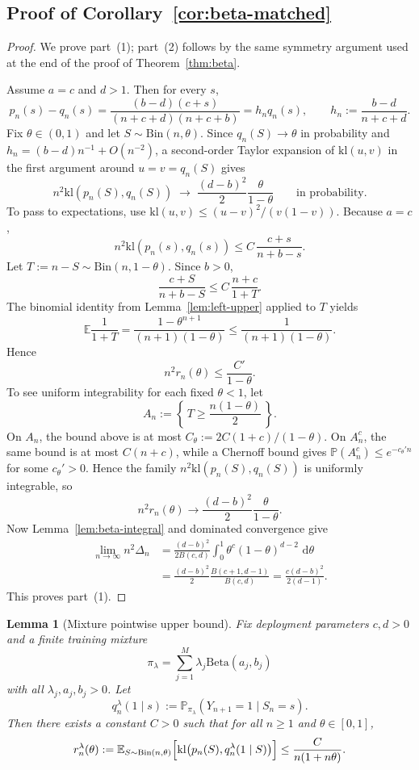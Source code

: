 \documentclass{article}
\newtheorem{lemma}[theorem]{Lemma}
\theoremstyle{definition}
\theoremstyle{remark}
\newcommand{\E}{\mathbb{E}}
\newcommand{\Pbb}{\mathbb{P}}
\newcommand{\BetaDist}{\mathrm{Beta}}
\newcommand{\Bin}{\mathrm{Bin}}
\newcommand{\klb}{\mathrm{kl}}
\newcommand{\dd}{\,\mathrm{d}}
\begin{document}
\subsection{Proof of Corollary~\ref{cor:beta-matched}}
\begin{proof}
We prove part~(1); part~(2) follows by the same symmetry argument used at the end of the proof of Theorem~\ref{thm:beta}.

Assume $a=c$ and $d>1$. Then for every $s$,
\[
p_n(s)-q_n(s)
=
\frac{(b-d)(c+s)}{(n+c+d)(n+c+b)}
=
h_n q_n(s),
\qquad
h_n:=\frac{b-d}{n+c+d}.
\]
Fix $\theta\in(0,1)$ and let $S\sim \Bin(n,\theta)$. Since $q_n(S)\to \theta$ in probability and $h_n=(b-d)n^{-1}+O(n^{-2})$, a second-order Taylor expansion of $\klb(u,v)$ in the first argument around $u=v=q_n(S)$ gives
\[
n^2 \klb(p_n(S),q_n(S))
\;\longrightarrow\;
\frac{(d-b)^2}{2}\frac{\theta}{1-\theta}
\qquad\text{in probability.}
\]
To pass to expectations, use $\klb(u,v)\le (u-v)^2/(v(1-v))$. Because $a=c$,
\[
n^2 \klb(p_n(s),q_n(s))
\le
C\,\frac{c+s}{n+b-s}.
\]
Let $T:=n-S\sim \Bin(n,1-\theta)$. Since $b>0$,
\[
\frac{c+S}{n+b-S}
\le
C\,\frac{n+c}{1+T}.
\]
The binomial identity from Lemma~\ref{lem:left-upper} applied to $T$ yields
\[
\E\frac{1}{1+T}
=
\frac{1-\theta^{n+1}}{(n+1)(1-\theta)}
\le
\frac{1}{(n+1)(1-\theta)}.
\]
Hence
\[
n^2 r_n(\theta)\le \frac{C'}{1-\theta}.
\]
To see uniform integrability for each fixed $\theta<1$, let
\[
A_n:=\left\{\,T\ge \frac{n(1-\theta)}{2}\,\right\}.
\]
On $A_n$, the bound above is at most $C_\theta:=2C(1+c)/(1-\theta)$. On $A_n^c$, the same bound is at most $C(n+c)$, while a Chernoff bound gives $\Pbb(A_n^c)\le e^{-c_\theta' n}$ for some $c_\theta'>0$. Hence the family $n^2\klb(p_n(S),q_n(S))$ is uniformly integrable, so
\[
n^2 r_n(\theta)
\longrightarrow
\frac{(d-b)^2}{2}\frac{\theta}{1-\theta}.
\]
Now Lemma~\ref{lem:beta-integral} and dominated convergence give
\begin{align*}
\lim_{n\to\infty} n^2\Delta_n
&=
\frac{(d-b)^2}{2B(c,d)}
\int_0^1 \theta^{c}(1-\theta)^{d-2}\,\dd\theta \\
&=
\frac{(d-b)^2}{2}\frac{B(c+1,d-1)}{B(c,d)}
=
\frac{c(d-b)^2}{2(d-1)}.
\end{align*}
This proves part~(1).
\end{proof}

\begin{lemma}[Mixture pointwise upper bound]
\label{lem:mix-upper}
Fix deployment parameters $c,d>0$ and a finite training mixture
\[
\pi_\lambda=\sum_{j=1}^M \lambda_j \BetaDist(a_j,b_j)
\]
with all $\lambda_j,a_j,b_j>0$. Let
\[
q_n^\lambda(1\mid s)
:=
\Pbb_{\pi_\lambda}(Y_{n+1}=1\mid S_n=s).
\]
Then there exists a constant $C>0$ such that for all $n\ge 1$ and $\theta\in[0,1]$,
\[
r_n^\lambda(\theta)
:=
\E_{S\sim \Bin(n,\theta)}
\Bigl[
\klb\bigl(p_n(S),q_n^\lambda(1\mid S)\bigr)
\Bigr]
\le
\frac{C}{n(1+n\theta)}.
\]
\end{lemma}
\end{document}
